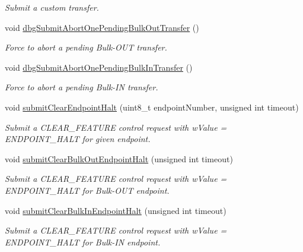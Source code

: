 \begin{DoxyCompactItemize}
\begin{DoxyCompactList}\small\item\em Submit a custom transfer. \end{DoxyCompactList}\item 
void \hyperlink{classmdt_usbtmc_transfer_handler_a1e07eea684c9025f5c601daf25faa2a3}{dbg\-Submit\-Abort\-One\-Pending\-Bulk\-Out\-Transfer} ()
\begin{DoxyCompactList}\small\item\em Force to abort a pending Bulk-\/\-O\-U\-T transfer. \end{DoxyCompactList}\item 
void \hyperlink{classmdt_usbtmc_transfer_handler_addd4a2ec80bb1a1128f993b0fab47e4b}{dbg\-Submit\-Abort\-One\-Pending\-Bulk\-In\-Transfer} ()
\begin{DoxyCompactList}\small\item\em Force to abort a pending Bulk-\/\-I\-N transfer. \end{DoxyCompactList}\item 
void \hyperlink{classmdt_usbtmc_transfer_handler_a275d1b39ebd9391983e227cc51bc0879}{submit\-Clear\-Endpoint\-Halt} (uint8\-\_\-t endpoint\-Number, unsigned int timeout)
\begin{DoxyCompactList}\small\item\em Submit a C\-L\-E\-A\-R\-\_\-\-F\-E\-A\-T\-U\-R\-E control request with w\-Value = E\-N\-D\-P\-O\-I\-N\-T\-\_\-\-H\-A\-L\-T for given endpoint. \end{DoxyCompactList}\item 
void \hyperlink{classmdt_usbtmc_transfer_handler_adecd6b66a99d1a4d49802299ea465ff5}{submit\-Clear\-Bulk\-Out\-Endpoint\-Halt} (unsigned int timeout)
\begin{DoxyCompactList}\small\item\em Submit a C\-L\-E\-A\-R\-\_\-\-F\-E\-A\-T\-U\-R\-E control request with w\-Value = E\-N\-D\-P\-O\-I\-N\-T\-\_\-\-H\-A\-L\-T for Bulk-\/\-O\-U\-T endpoint. \end{DoxyCompactList}\item 
void \hyperlink{classmdt_usbtmc_transfer_handler_a0c75ed4ef7f3e216a1db8e8414fc896d}{submit\-Clear\-Bulk\-In\-Endpoint\-Halt} (unsigned int timeout)
\begin{DoxyCompactList}\small\item\em Submit a C\-L\-E\-A\-R\-\_\-\-F\-E\-A\-T\-U\-R\-E control request with w\-Value = E\-N\-D\-P\-O\-I\-N\-T\-\_\-\-H\-A\-L\-T for Bulk-\/\-I\-N endpoint. \end{DoxyCompactList}\item 

\end{DoxyCompactItemize}
